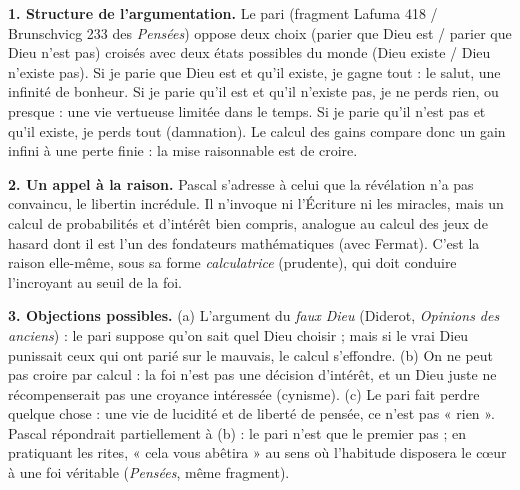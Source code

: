 \documentclass[11pt]{article}
\begin{document}
\begin{corrige}
\textbf{1. Structure de l'argumentation.} Le pari (fragment Lafuma 418 / Brunschvicg 233 des \emph{Pensées}) oppose deux choix (parier que Dieu est / parier que Dieu n'est pas) croisés avec deux états possibles du monde (Dieu existe / Dieu n'existe pas). Si je parie que Dieu est et qu'il existe, je gagne tout : le salut, une infinité de bonheur. Si je parie qu'il est et qu'il n'existe pas, je ne perds rien, ou presque : une vie vertueuse limitée dans le temps. Si je parie qu'il n'est pas et qu'il existe, je perds tout (damnation). Le calcul des gains compare donc un gain infini à une perte finie : la mise raisonnable est de croire.

\textbf{2. Un appel à la raison.} Pascal s'adresse à celui que la révélation n'a pas convaincu, le libertin incrédule. Il n'invoque ni l'Écriture ni les miracles, mais un calcul de probabilités et d'intérêt bien compris, analogue au calcul des jeux de hasard dont il est l'un des fondateurs mathématiques (avec Fermat). C'est la raison elle-même, sous sa forme \emph{calculatrice} (prudente), qui doit conduire l'incroyant au seuil de la foi.

\textbf{3. Objections possibles.} (a) L'argument du \emph{faux Dieu} (Diderot, \emph{Opinions des anciens}) : le pari suppose qu'on sait quel Dieu choisir ; mais si le vrai Dieu punissait ceux qui ont parié sur le mauvais, le calcul s'effondre. (b) On ne peut pas croire par calcul : la foi n'est pas une décision d'intérêt, et un Dieu juste ne récompenserait pas une croyance intéressée (cynisme). (c) Le pari fait perdre quelque chose : une vie de lucidité et de liberté de pensée, ce n'est pas « rien ». Pascal répondrait partiellement à (b) : le pari n'est que le premier pas ; en pratiquant les rites, « cela vous abêtira » au sens où l'habitude disposera le cœur à une foi véritable (\emph{Pensées}, même fragment).
\end{corrige}
\end{document}

